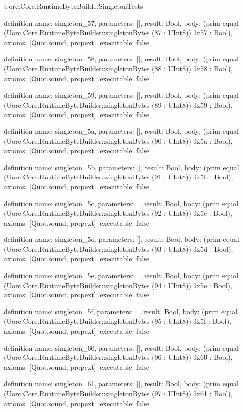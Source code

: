 \begin{lexlean}{Uorc.Core.RuntimeByteBuilderSingletonTests}
\begin{semanticmodule}
definition{
  name: singleton_57,
  parameters: [],
  result: Bool,
  body: (prim equal (Uorc.Core.RuntimeByteBuilder::singletonBytes (87 : UInt8)) 0x57 : Bool),
  axioms: [Quot.sound, propext],
  executable: false
}

definition{
  name: singleton_58,
  parameters: [],
  result: Bool,
  body: (prim equal (Uorc.Core.RuntimeByteBuilder::singletonBytes (88 : UInt8)) 0x58 : Bool),
  axioms: [Quot.sound, propext],
  executable: false
}

definition{
  name: singleton_59,
  parameters: [],
  result: Bool,
  body: (prim equal (Uorc.Core.RuntimeByteBuilder::singletonBytes (89 : UInt8)) 0x59 : Bool),
  axioms: [Quot.sound, propext],
  executable: false
}

definition{
  name: singleton_5a,
  parameters: [],
  result: Bool,
  body: (prim equal (Uorc.Core.RuntimeByteBuilder::singletonBytes (90 : UInt8)) 0x5a : Bool),
  axioms: [Quot.sound, propext],
  executable: false
}

definition{
  name: singleton_5b,
  parameters: [],
  result: Bool,
  body: (prim equal (Uorc.Core.RuntimeByteBuilder::singletonBytes (91 : UInt8)) 0x5b : Bool),
  axioms: [Quot.sound, propext],
  executable: false
}

definition{
  name: singleton_5c,
  parameters: [],
  result: Bool,
  body: (prim equal (Uorc.Core.RuntimeByteBuilder::singletonBytes (92 : UInt8)) 0x5c : Bool),
  axioms: [Quot.sound, propext],
  executable: false
}

definition{
  name: singleton_5d,
  parameters: [],
  result: Bool,
  body: (prim equal (Uorc.Core.RuntimeByteBuilder::singletonBytes (93 : UInt8)) 0x5d : Bool),
  axioms: [Quot.sound, propext],
  executable: false
}

definition{
  name: singleton_5e,
  parameters: [],
  result: Bool,
  body: (prim equal (Uorc.Core.RuntimeByteBuilder::singletonBytes (94 : UInt8)) 0x5e : Bool),
  axioms: [Quot.sound, propext],
  executable: false
}

definition{
  name: singleton_5f,
  parameters: [],
  result: Bool,
  body: (prim equal (Uorc.Core.RuntimeByteBuilder::singletonBytes (95 : UInt8)) 0x5f : Bool),
  axioms: [Quot.sound, propext],
  executable: false
}

definition{
  name: singleton_60,
  parameters: [],
  result: Bool,
  body: (prim equal (Uorc.Core.RuntimeByteBuilder::singletonBytes (96 : UInt8)) 0x60 : Bool),
  axioms: [Quot.sound, propext],
  executable: false
}

definition{
  name: singleton_61,
  parameters: [],
  result: Bool,
  body: (prim equal (Uorc.Core.RuntimeByteBuilder::singletonBytes (97 : UInt8)) 0x61 : Bool),
  axioms: [Quot.sound, propext],
  executable: false
}


\end{semanticmodule}
\end{lexlean}
